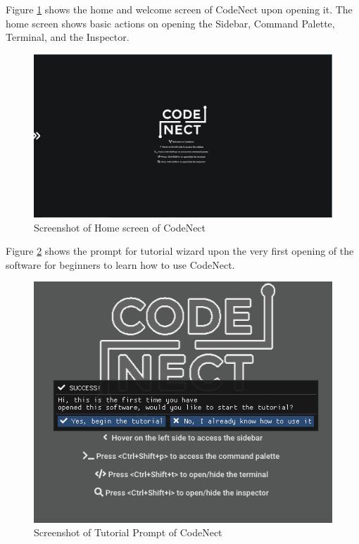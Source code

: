 \parx
Figure \ref{fig:cn_home} shows the home and welcome screen of CodeNect upon opening it.
The home screen shows basic actions on opening the Sidebar, Command Palette, Terminal,
and the Inspector.

\begin{figure}[H]
	\centering
	\captionsetup{justification=centering}
	\captionsetup[figure]{list=yes}
	\includegraphics[width=\linewidth]{media/sc_home.png}
	\caption[Screenshot of Home Screen of CodeNect]{Screenshot of Home screen of CodeNect}
	\label{fig:cn_home}
\end{figure}

\parx
Figure \ref{fig:cn_tutorial_prompt} shows the prompt for tutorial wizard upon the very
first opening of the software for beginners to learn how to use CodeNect.

\begin{figure}[H]
	\centering
	\captionsetup{justification=centering}
	\captionsetup[figure]{list=yes}
	\includegraphics[width=\linewidth]{media/sc_tutorial_prompt.png}
	\caption[Screenshot of Tutorial Prompt of CodeNect]{Screenshot of Tutorial Prompt of CodeNect}
	\label{fig:cn_tutorial_prompt}
\end{figure}


